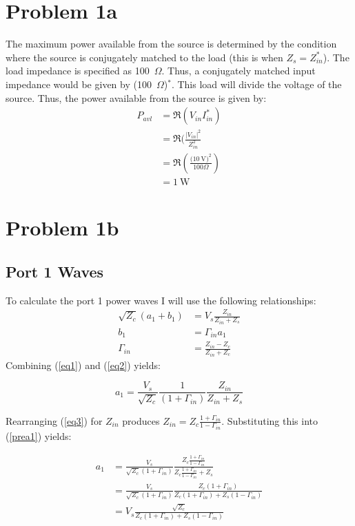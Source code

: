 \section*{Problem 1a}
The maximum power available from the source is determined by the condition where
the source is conjugately matched to the load (this is when $Z_s = Z_{in}^*$).
The load impedance is specified as 100~$\Omega$. Thus, a conjugately matched
input impedance would be given by (100~$\Omega$)$^*$. This load will divide the
voltage of the source. Thus, the power available
from the source is given by:
\begin{align*}
    P_{avl} &= \Re(V_{in}I_{in}^*) \\
            &= \Re(\frac{|V_{in}|^2}{Z_{in}^2} \\
            &= \Re\left(\frac{(\SI{10}{\volt)^2}}{100 \Omega}\right) \\
            &= \SI{1}{\watt}
\end{align*}
\section*{Problem 1b}
\subsection*{Port 1 Waves}
To calculate the port 1 power waves I will use the following 
relationships:
\begin{align}
    \sqrt{Z_c}\left( a_1 + b_1 \right) &= V_s \frac{Z_{in}}{Z_{in}+Z_s}
    \label{eq1} \\
    b_1 &= \Gamma_{in}a_1 \label{eq2} \\
    \Gamma_{in} &=\frac{Z_{in}-Z_c}{Z_{in}+Z_c} \label{eq3}
\end{align}
Combining (\ref{eq1}) and (\ref{eq2}) yields:

\begin{equation}
    a_1 = \frac{V_s}{\sqrt{Z_c}} \frac{1}{( 1+\Gamma_{in} )}
    \frac{Z_{in}}{Z_{in}+Z_s} \label{prea1}
\end{equation}

Rearranging (\ref{eq3}) for $Z_{in}$ produces $Z_{in} = Z_c
\frac{1+\Gamma_{ in }}{1-\Gamma_{ in }}$. Substituting this into (\ref{prea1}) yields:

\begin{align}
    a_1 &= \frac{V_s}{\sqrt{Z_c}( 1+\Gamma_{in} )} \frac{Z_c \frac{1+\Gamma_{ in }}{1-\Gamma_{
    in }}}{Z_c \frac{1+\Gamma_{ in }}{1-\Gamma_{ in }} + Z_s} \nonumber \\
    &= \frac{V_s}{\sqrt{Z_c}( 1+\Gamma_{in} )} \frac{Z_c \left( 1+\Gamma_{in}
    \right)}{Z_c \left( 1+ \Gamma_{in} \right) + Z_s \left( 1 - \Gamma_{in}
    \right)} \nonumber \\
    &= V_s \frac{\sqrt{Z_c}}{Z_c \left( 1+\Gamma_{in} \right) + Z_s \left( 1 -
\Gamma_{in} \right) } \label{a1}
\end{align}

